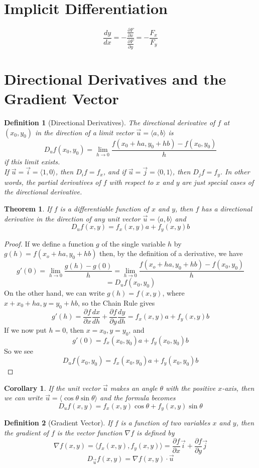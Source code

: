 \documentclass[10pt]{report}
\newtheorem{thm2}{Theorem}[section]
\newtheorem{cor2}{Corollary}[section]
\newtheorem{def2}{Definition}[section]
\newcommand{\grad}{\nabla}
\begin{document}
\section{Implicit Differentiation}
$$\frac{dy}{dx} = -\frac{\frac{\partial F}{\partial x}}{\frac{\partial F}{\partial y}} = -\frac{F_x}{F_y}$$
\section{Directional Derivatives and the Gradient Vector}
\begin{def2}[Directional Derivatives]
The directional derivative of $f$ at $(x_0, y_0)$ in the direction of a limit vector $\vec{u}=\langle a,b\rangle$ is
$$D_uf(x_0,y_0)=\lim_{h\to 0}\frac{f(x_0 +ha,y_0+hb)-f(x_0,y_0)}{h}$$
if this limit exists.\\
If $\vec{u}=\vec{i}=\langle 1,0\rangle$, then $D_if=f_x$, and if $\vec{u}=\vec{j}=\langle 0,1\rangle$, then $D_jf=f_y$. In other words, the partial derivatives of $f$ with respect to $x$ and $y$ are just special cases of the directional derivative.
\end{def2}
\begin{thm2}
If $f$ is a differentiable function of $x$ and $y$, then $f$ has a directional derivative in the direction of any unit vector $\vec{u}=\langle a,b \rangle$ and
$$D_uf(x,y) = f_x(x,y)a +f_y(x,y)b$$
\end{thm2}
\begin{proof}
If we define a function $g$ of the single variable $h$ by
$g(h)=f(x_o+ha, y_0+hb)$
then, by the definition of a derivative, we have
$$g'(0) = \lim_{h\to 0}\frac{g(h)-g(0)}{h} = \lim_{h\to 0}\frac{f(x_o+ha, y_0+hb)- f(x_0,y_0)}{h}$$
$$=D_uf(x_0,y_0)$$
On the other hand, we can write $g(h)=f(x,y)$, where$x+x_0+ha, y=y_0+hb$, so the Chain Rule gives
$$g'(h)=\frac{\partial f}{\partial x}\frac{dx}{dh} + \frac{\partial f}{\partial y}\frac{dy}{dh} = f_x(x,y)a + f_y(x,y)b$$
If we now put $h=0$, then $x=x_0,y=y_0$, and
$$g'(0) = f_x(x_0,y_0)a+f_y(x_0,y_0)b$$
So we see
$$D_uf(x_0,y_0)=f_x(x_0,y_0)a+f_y(x_0,y_0)b$$
\end{proof}
\begin{cor2}
If the unit vector $\vec{u}$ makes an angle $\theta$ with the positive $x$-axis, then we can write $\vec{u}=\langle \cos\theta \sin\theta \rangle$ and the formula becomes
$$D_uf(x,y) = f_x(x,y)\cos\theta + f_y(x,y)\sin\theta$$
\end{cor2}
\begin{def2}[Gradient Vector]
If $f$ is a function of two variables $x$ and $y$, then the gradient of $f$ is the vector function $\grad f$ is defined by
$$\grad f(x,y) = \langle f_x(x,y), f_y(x,y)\rangle = \frac{\partial f}{\partial x}\vec{i} + \frac{\partial f}{\partial y}\vec{j}$$
$$D_{\vec{u}} f(x,y)=\grad f(x,y)\cdot \vec{u}$$
\end{def2}
\end{document}
